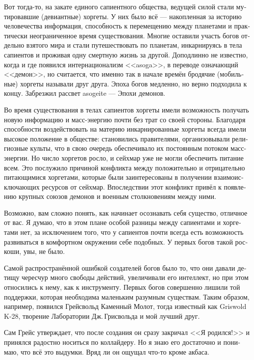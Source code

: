 \documentclass[a4paper,12pt,fleqn]{book}\usepackage{polyglossia}\setdefaultlanguage[babelshorthands=true]{russian}\setotherlanguage{english}\defaultfontfeatures{Ligatures=TeX,Mapping=tex-text}\usepackage{xcolor}\newcommand{\ml}[3]{#2}
\newcommand{\textspace}{\vspace{1em}{\centering\Large\bfseries<...>\par}\vspace{1em}}
\begin{document}
{Вот тогда-то, на закате единого сапиентного общества, ведущей силой стали мутировавшие (девиантные) хоргеты.
У них было всё --- накопленная за историю человечества информация, способность к перемещению между планетами и практически неограниченное время существования.
Многие оставили участь богов отдельно взятого мира и стали путешествовать по планетам, инкарнируясь в тела сапиентов и проживая одну смертную жизнь за другой.
Доподлинно не известно, когда и где появился интернационализм <<asoga>>, в переводе означающий <<демон>>, но считается, что именно так в начале времён бродячие (мобильные) хоргеты называли друг друга.
Эпоха богов медленно, но верно подходила к концу.
Забрезжил рассвет asogeite --- Эпохи демонов.

Во время существования в телах сапиентов хоргеты имели возможность получать новую информацию и масс-энергию почти без трат со своей стороны.
Благодаря способности воздействовать на материю инкарнированные хоргеты всегда имели высокое положение в обществе: становились правителями, организовывали религиозные культы, что в свою очередь обеспечивало их постоянным потоком масс-энергии.
Но число хоргетов росло, и сейхмар уже не могли обеспечить питание всем.
Это послужило причиной конфликта между положительно и отрицательно питающимися хоргетами, которые были заинтересованы в получении взаимоисключающих ресурсов от сейхмар.
Впоследствии этот конфликт привёл к появлению крупных союзов демонов и военным столкновениям между ними.

\textspace

Возможно, вам сложно понять, как начинает осознавать себя существо, отличное от вас.
Я думаю, что в этом плане особой разницы между сапиентами и хоргетами нет, за исключением того, что у сапиентов почти всегда есть возможность развиваться в комфортном окружении себе подобных.
У первых богов такой роскоши, увы, не было.

Самой распространённой ошибкой создателей богов было то, что они давали детищу чересчур много свободы действий, увеличивали его интеллект, но при этом относились к нему, как к инструменту.
Первых богов совершенно лишили той поддержки, которая необходима маленьким разумным существам.
Таким образом, например, появился Грейсвольд Каменный Молот, тогда известный как Griswold K-28, творение Лаборатории Дж.\,Грисвольда и мой лучший друг.

Сам Грейс утверждает, что после создания он сразу закричал <<Я родился!>> и принялся радостно носиться по коллайдеру.
Но я знаю его достаточно и понимаю, что всё это выдумки.
Вряд ли он ощущал что-то кроме акбаса.

}
\end{document}
